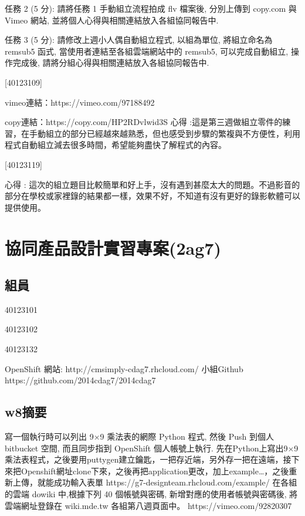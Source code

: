 \documentclass[]{article}
\begin{document}
任務 2 (5 分): 請將任務 1 手動組立流程拍成 flv 檔案後, 分別上傳到
copy.com 與 Vimeo 網站, 並將個人心得與相關連結放入各組協同報告中.

任務 3 (5 分): 請修改上週小人偶自動組立程式, 以組為單位, 將組立命名為
remsub5 函式, 當使用者連結至各組雲端網站中的 remsub5, 可以完成自動組立,
操作完成後, 請將分組心得與相關連結放入各組協同報告中.

{[}40123109{]}

vimeo連結：https://vimeo.com/97188492

copy連結：https://copy.com/HP2RDvlwid3S 心得
:這是第三週做組立零件的練習，在手動組立的部分已經越來越熟悉，但也感受到步驟的繁複與不方便性，利用程式自動組立減去很多時間，希望能夠盡快了解程式的內容。

{[}40123119{]}

心得 :
這次的組立題目比較簡單和好上手，沒有遇到甚麼太大的問題。不過影音的部分在學校或家裡錄的結果都一樣，效果不好，不知道有沒有更好的錄影軟體可以提供使用。

\section{協同產品設計實習專案(2ag7)}\label{ux5354ux540cux7522ux54c1ux8a2dux8a08ux5be6ux7fd2ux5c08ux68482ag7}

\subsection{組員}\label{ux7d44ux54e1-2}

40123101

40123102

40123132

OpenShift 網站: http://cmsimply-cdag7.rhcloud.com/ 小組Github
https://github.com/2014cdag7/2014cdag7

\subsection{w8摘要}\label{w8ux6458ux8981}

寫一個執行時可以列出 9×9 乘法表的網際 Python 程式, 然後 Push 到個人
bitbucket 空間, 而且同步指到 OpenShift 個人帳號上執行.
先在Python上寫出9×9
乘法表程式，之後要用puttygen建立鑰匙，一把存近端，另外存一把在遠端，接下來把Openshift網址clone下來，之後再把application更改，加上example\ldots{}，之後重新上傳，就能成功輸入表單
https://g7-designteam.rhcloud.com/example/ 在各組的雲端 dowiki
中,根據下列 40 個帳號與密碼, 新增對應的使用者帳號與密碼後,
將雲端網址登錄在 wiki.mde.tw 各組第八週頁面中。
https://vimeo.com/92820307
\end{document}
